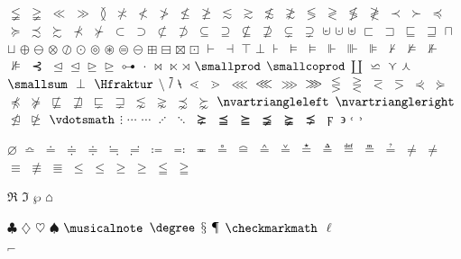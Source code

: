 \documentclass[captions=tableheading]{scrartcl}
\begin{document}
$\lneqq$
$\gneqq$
$\ll$
$\gg$
$\between$
$\nasymp$
$\nless$
$\ngtr$
$\nleq$
$\ngeq$
$\lesssim$
$\gtrsim$
$\nlesssim$
$\ngtrsim$
$\lessgtr$
$\gtrless$
$\nlessgtr$
$\ngtrless$
$\prec$
$\succ$
$\preccurlyeq$
$\succcurlyeq$
$\precsim$
$\succsim$
$\nprec$
$\nsucc$
$\subset$
$\supset$
$\nsubset$
$\nsupset$
$\subseteq$
$\supseteq$
$\nsubseteq$
$\nsupseteq$
$\subsetneq$
$\supsetneq$
$\cupleftarrow$
$\cupdot$
$\uplus$
$\sqsubset$
$\sqsupset$
$\sqsubseteq$
$\sqsupseteq$
$\sqcap$
$\sqcup$
$\oplus$
$\ominus$
$\otimes$
$\oslash$
$\odot$
$\circledcirc$
$\circledast$
$\circledequal$
$\circleddash$
$\boxplus$
$\boxminus$
$\boxtimes$
$\boxdot$
$\vdash$
$\dashv$
$\top$
$\bot$
$\assert$
$\models$
$\vDash$
$\Vdash$
$\Vvdash$
$\VDash$
$\nvdash$
$\nvDash$
$\nVdash$
$\nVDash$
$\prurel$
$\trianglelefteq$
$\unlhd$
$\trianglerighteq$
$\unrhd$
$\origof$
$\cdot$
$\bowtie$
$\ltimes$
$\rtimes$
$\smallprod$
$\smallcoprod$ $\amalg$
$\backsimeq$
$\curlyvee$
$\curlywedge$
$\smallsum$
$\perp$
$\Hfraktur$
$\setminus$
$\dsol$
$\rsolbar$
$\lessdot$
$\gtrdot$
$\lll$ $\llless$
$\ggg$ $\gggtr$
$\lesseqgtr$
$\gtreqless$
$\eqless$
$\eqgtr$
$\curlyeqprec$
$\curlyeqsucc$
$\npreccurlyeq$
$\nsucccurlyeq$
$\nsqsubseteq$
$\nsqsupseteq$
$\sqsubsetneq$
$\sqsupsetneq$
$\lnsim$
$\gnsim$
$\precnsim$
$\succnsim$
$\nvartriangleleft$
$\nvartriangleright$
$\ntrianglelefteq$
$\ntrianglerighteq$
$\vdotsmath$
$\vdots$
$\unicodecdots$
$\cdots$
$\adots$
$\ddots$
$\succneq$
$\preceqq$
$\succeqq$
$\precneqq$
$\succneqq$
$\precneq$
$\digamma$
$\backepsilon$
$\lhook$
$\rhook$

$\diameter$
$\bumpeq$
$\doteq$
$\Doteq$ $\doteqdot$
$\fallingdotseq$
$\risingdotseq$
$\coloneq$
$\eqcolon$
$\eqcirc$
$\circeq$
$\arceq$
$\wedgeq$
$\veeeq$
$\stareq$
$\triangleq$
$\eqdef$
$\measeq$
$\questeq$
$\ne$ $\neq$
$\equiv$
$\nequiv$
$\Equiv$
$\leq$ $\le$
$\geq$ $\ge$
$\leqq$
$\geqq$

$\Re$
$\Im$
$\wp$
$\house$

$\clubsuit$
$\diamondsuit$
$\heartsuit$
$\spadesuit$
$\musicalnote$
$\degree$
$\mathsection$
$\mathparagraph$
$\checkmarkmath$
$\ell$


$\invnot$

\end{document}
